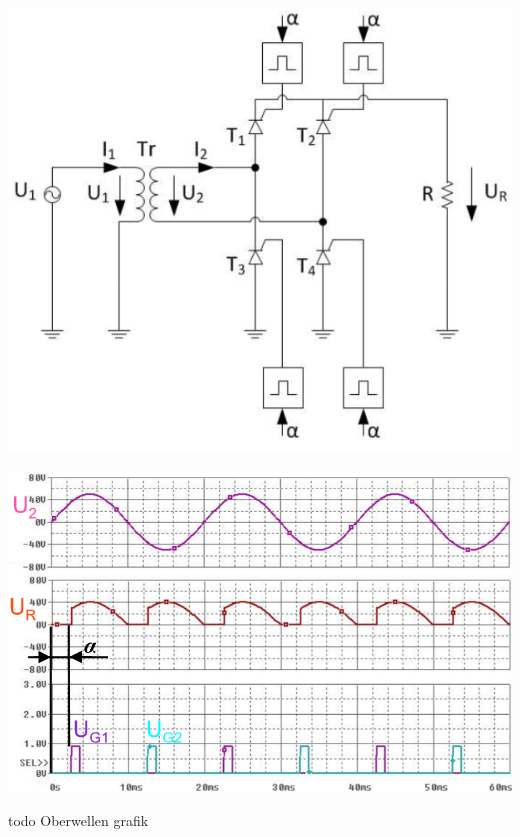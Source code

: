 \begin{minipage}{0.4\linewidth}
    \includegraphics[width=0.8\linewidth]{images/GRB2c}
\end{minipage}
\begin{minipage}{0.35\linewidth}
    \centering 
    \includegraphics[width=\linewidth]{images/B2CKl}
    
\end{minipage}
\begin{minipage}{0.25\linewidth}
  todo Oberwellen grafik %
\end{minipage}
\newline



